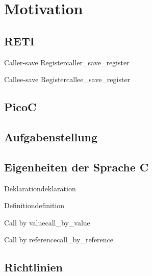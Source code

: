 \chapter{Motivation}
\label{ch:motivation}

\section{RETI}
\begin{Definition}{Caller-save Register}{caller_save_register}
\end{Definition}

\begin{Definition}{Callee-save Register}{callee_save_register}
\end{Definition}

\section{PicoC}
\section{Aufgabenstellung}
\section{Eigenheiten der Sprache C}

\begin{Definition}{Deklaration}{deklaration}
\end{Definition}

\begin{Definition}{Definition}{definition}
\end{Definition}

\begin{Definition}{Call by value}{call_by_value}
\end{Definition}

\begin{Definition}{Call by reference}{call_by_reference}
\end{Definition}


\section{Richtlinien}
